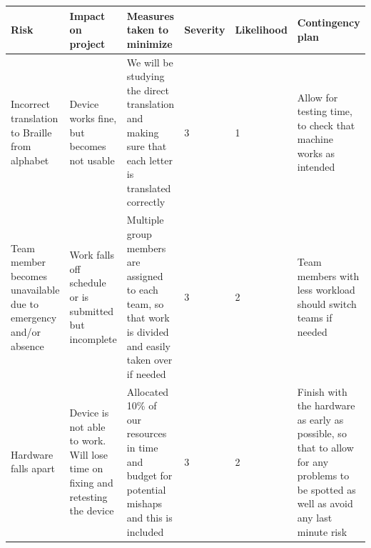 \documentclass{article}
\begin{document}
\begin{table}[h]
\begin{center}
\begin{small}
\begin{tabular}{|p{3cm}|p{3cm}|p{3cm}|p{0.5cm}|p{0.5cm}|p{3cm}|}
\hline
\rowcolor[HTML]{C0C0C0} 
Risk                                                                                              & Impact on project                                                                                               & Measures taken to minimize                                                                                                                                                                                & Severity & Likelihood & Contingency plan                                                                                                                                  \\ \hline
Incorrect translation to Braille from alphabet                                                    & Device works fine, but becomes not usable                                                                       & We will be studying the direct translation and making sure that each letter is translated correctly                                                                                                       & 3        & 1          & Allow for testing time, to check that machine works as intended                                                                                   \\ \hline
Team member becomes unavailable due to emergency and/or absence                                   & Work falls off schedule or is submitted but incomplete                                                          & Multiple group members are assigned to each team, so that work is divided and easily taken over if needed                                                                                                 & 3        & 2          & Team members with less workload should switch teams if needed                                                                                     \\ \hline
Hardware falls apart                                                                              & Device is not able to work. Will lose time on fixing and retesting the device                                   & Allocated 10\% of our resources in time and budget for potential mishaps and this is included                                                                                                             & 3        & 2          & Finish with the hardware as early as possible, so that to allow for any problems to be spotted as well as avoid any last minute risk              \\ \hline

\end{tabular}
\end{small}
\end{center}
\end{table}
\end{document}
